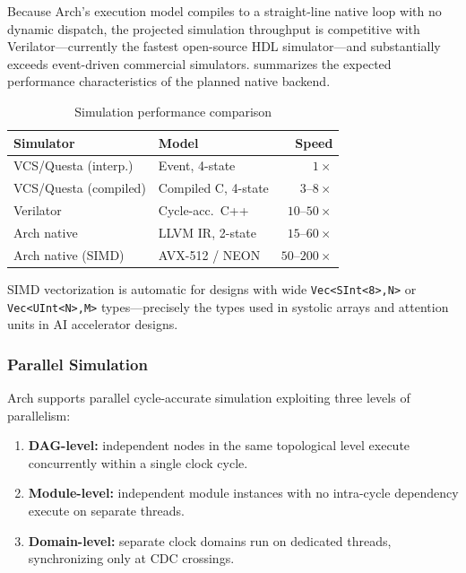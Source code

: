 \documentclass[11pt,twocolumn]{article}
\begin{document}
Because Arch's execution model compiles to a straight-line native loop with no dynamic dispatch, the projected simulation throughput is competitive with Verilator---currently the fastest open-source HDL simulator---and substantially exceeds event-driven commercial simulators.  summarizes the expected performance characteristics of the planned native backend.

\begin{table}[!t]
\centering
\caption{Simulation performance comparison}
\label{tab:perf}
\footnotesize
\begin{tabular}{@{}llr@{}}
\toprule
\textbf{Simulator} & \textbf{Model} & \textbf{Speed} \\
\midrule
VCS/Questa (interp.) & Event, 4-state & $1\times$ \\
VCS/Questa (compiled) & Compiled C, 4-state & $3$--$8\times$ \\
Verilator & Cycle-acc.\ C++ & $10$--$50\times$ \\
Arch native & LLVM IR, 2-state & $15$--$60\times$ \\
Arch native (SIMD) & AVX-512 / NEON & $50$--$200\times$ \\
\bottomrule
\end{tabular}
\end{table}

SIMD vectorization is automatic for designs with wide \texttt{Vec<SInt<8>,N>} or \texttt{Vec<UInt<N>,M>} types---precisely the types used in systolic arrays and attention units in AI accelerator designs.

\subsubsection{Parallel Simulation}

Arch supports parallel cycle-accurate simulation exploiting three levels of parallelism:

\begin{enumerate}
\item \textbf{DAG-level:} independent nodes in the same topological level execute concurrently within a single clock cycle.
\item \textbf{Module-level:} independent module instances with no intra-cycle dependency execute on separate threads.
\item \textbf{Domain-level:} separate clock domains run on dedicated threads, synchronizing only at CDC crossings.
\end{enumerate}
\end{document}

